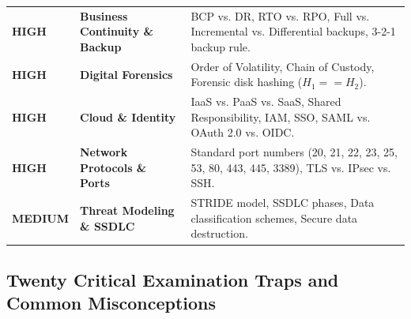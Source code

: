 \begin{table}[htbp]
\begin{tabularx}{\textwidth}{l p{4.2cm} X}
\textbf{HIGH} & \textbf{Business Continuity \& Backup} & BCP vs. DR, RTO vs. RPO, Full vs. Incremental vs. Differential backups, 3-2-1 backup rule. \\
\textbf{HIGH} & \textbf{Digital Forensics} & Order of Volatility, Chain of Custody, Forensic disk hashing ($H_1 == H_2$). \\
\textbf{HIGH} & \textbf{Cloud \& Identity} & IaaS vs. PaaS vs. SaaS, Shared Responsibility, IAM, SSO, SAML vs. OAuth 2.0 vs. OIDC. \\
\textbf{HIGH} & \textbf{Network Protocols \& Ports} & Standard port numbers (20, 21, 22, 23, 25, 53, 80, 443, 445, 3389), TLS vs. IPsec vs. SSH. \\
\textbf{MEDIUM} & \textbf{Threat Modeling \& SSDLC} & STRIDE model, SSDLC phases, Data classification schemes, Secure data destruction. \\
\bottomrule
\end{tabularx}
\end{table}

\subsection{Twenty Critical Examination Traps and Common Misconceptions}

